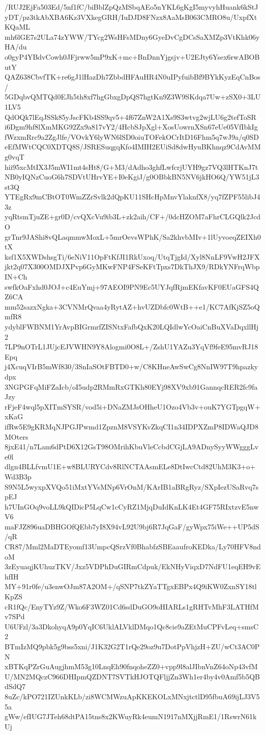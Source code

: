 /RUJ2EjFa503Ed/5nf1fC/biBblZpQzMSbqAEo5nYKL6gKgI5myvyhHuank6kStJ
yDT/pz3tkAbXBA6Kz3VXkegGRH/IuDJD8FNzx8AaMsB063CMRO8u/UxpfXtKQaML
mh6lGE7s2ULa74zYWW/TYcg2WsHFsMDny6GyeDvCgDCsSaXMZp3VtKhk06yHA/du
o0gyP4YBdvCowh0JFjrww5mP9xK+mc+BnDnnYjgsjv+U2EJty6Ysex6rwABOButY
QAZ638CbvfTK+re6gJ1lHazDh7ZbbdHFAuHR4N0uIPyfuibBf9BYkKyzEqCnBos/
5GDqbvQMTQd0EJh5th8xf7hgGbxgDpQS7hgtKn9Z3W9SKdqa7Uw+zSX0+3LU1LV5
QdOQk7lEqJSSk85yJscFKb4SS9qv5+4f67ZnW2A1Xs9S3wtvg2wjLU6g2tefToSR
i6Dgm9hf8lXmMKG92Zx9a817vY2/4HcbSJpXgl+XosUowrnXSn67eUe05VfIbkIg
fWzxmRrc9a2ZgJlfe/VOvkY6lyWN6lSD0oiuTOFekOCrItD16Fhm5q7wJ9a/q0SD
eEfMWtCQC0XDTQ8S/JSRESuqgqKfo4IMIH2EUiSd8dwHyuBKhnqz9CdAvMMg0vqT
hii95xcMtIX3J5mWI1mt4sHt8/G+M3/dAdho3ghfLwfcrjUYH9gz7VQ3lHTKnJ7t
NB0yIQNzCuoG6h7SDVtUHrvYE+I0eKgiJ/g0OBbkBN5NV6jkHO6Q/YW51jL3st3Q
YTEgRx9mCBtOT0WmZZrSvlk2dQpKU11SHcHpMnvYlaknfX8/yq7fZPF55libJ43z
yqRtsmTjuZE+gr0D/cvQXcVu9ib3L+zk2aih/CF+/0dcHZOM7aFhrCLGQlk2JcdO
grTnr9JAShi8vQLaqmmwMoxL+5mrOevsWPhK/Sa2khvbMIv+1lUyvoeqZEIXh0tX
ksf1X5XWDshsgTi/6eNiV11OpFtKfJI1RkUxoq/UtqTjgId/Xyl8NnLF9VwH2JFX
jkt2q07X300OMDJXPvp6GyMKwFNP4FSeKFtTpxs7DkThJX9/RDkYNFrqWbpIN+Ch
swfkOaFxhd0JOJ+c4EuYmj+97AEOI9PN9Ec5UYJqfRjmEKfavKF0EUaGFS4QZ6CA
mm52sazxNgka+3CVNMrQvaa4yRytAZ+hvUZDbfc0WtB++e1/KC7AfKjSZ5oQmfR8
ydyblFWBNM1YrAvpBIGrmrfZISNtxFafbQxK20LQIdlwYcOaiCnBuXVaDqxllHj2
7LP9nOTrL1JUjcEJVWHN9Y8Alogmi0O8L+/ZshU1YAZu3YqVf9feE95mvRJ18Epq
j4XcuqVIrB5mWf830/3SnIaSOtFBTD0+w/C8KHneAwSwCg8NnIW97T9hpazkydpx
3NGPGFqMiFZaIcb/oI5udp2RMmRxGTKh80EYj98XV9xb91GannqcRER2fc9faJzy
rFjeF4wql5pXITmSYSR/vod5i+DNaZMJsOHheU1Ozo4Vb3v+ouK7YGTpgqW+xKaG
ifRw5E9gKRMqNJPGJPwmd1ZpznM8VSYKvZkqCI1n34IDPXZmP8IDWaQJD8MOters
8jxE41/n7Lam6dPtD6X12GsT98OMrihKbuVleCcbdCGjLA9ADnySyyWWgggLve0l
dlgn4BLLfvmU1E+w8BLURYCdv8RlNCTAAsmELe8DtIwcCtd82UhM3K3+o+Wd3B3p
S9N5L5wyxpXVQo51iMxtYVsMNp6VrOnM/KArIB1aBRgRyz/SXpIezUSaRvq7spEJ
h7UInGOq9voLL9kQIDicP5LqCw1cCyRZ1MjqDuIdKnLK4Et4GF75RIxtzvE5nwV6
maFJZ896uaDBHGOfQEbb7yI8X94vL92U9bj6R7JqGaF/gyWpx75iWe++UP5dS/qR
CR87/Mml2MaDTEyomf13UmpcQSrzVf0BhabfzSBEaaufroKEDka/Ly70HFV8ndoM
3zEyuaqjKUhuzTKV/Jxz5VDPhDuGIRmCdpuk/EkNHyViqxD7NdFU1eqEH9vEhfIH
MY+91r0fe/u3enwOJm87A2OM+/qSNP7tkZYaTTgxEBPx4Q9iKW0ZxnSY18tlKpZS
cR1fQc/EnyTYz9Z/Wko6F3WZ01Cd6sdDuGO9oHIARLs1gRHTvMhF3LATHfMv7SPd
U6UFzl/3a3DkohyqA9p0YqIC6UklALVklDMqo1Qc8cie9aZEtMuCPFvLeq+smsC2
BTmIzMQ9pbk5g9bss5xni/J1K32G2T1rQe29oz9u7DotPpVhjzH+ZU/wCt3AC0PN
xBTKqPZrGuAugjhmM53g10LnqEh90fnqoheZZ0+vpp9l8alJIbnVnZ64oNp43vfM
U/MN2MQczC966DHIpmQZDNT7SVTkHJOTQFljjZn3Wh1er4by4v0Amf5b5QBdSdQ7
8uZc/kPO721IZUnkKLb/zi8WCMWzuApKKEKOLxMNxjtctlD95fbuA69ijLJ3V55a
gWw/efIUG7JTeh68dtPA15tns8x2KWuyRk4eumN1917nMXjjRmE1/1RswrN61kUj
